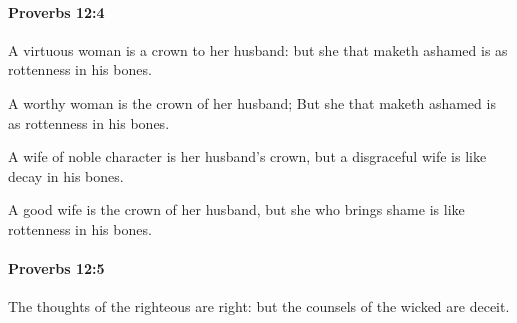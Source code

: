 		\paragraph{Proverbs 12:4} %
			\label{PROVERBS-12-4}

			A virtuous woman is a crown to her husband: but she that maketh ashamed is as rottenness in his bones.

			\begin{versebox}
					\item[BHS] 
					\item[ASV] A worthy woman is the crown of her husband; But she that maketh ashamed is as rottenness in his bones.
					\item[NIV] A wife of noble character is her husband’s crown, but a disgraceful wife is like decay in his bones.
					\item[NRSV] A good wife is the crown of her husband, but she who brings shame is like rottenness in his bones.
			\end{versebox}

		\paragraph{Proverbs 12:5} %
			\label{PROVERBS-12-5}

			The thoughts of the righteous are right: but the counsels of the wicked are deceit.

